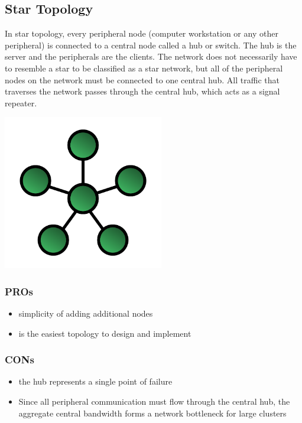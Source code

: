 \documentclass[a4paper,12pt]{book}
\begin{document}
\subsection{Star Topology}

In star topology, every peripheral node (computer workstation or any other peripheral) is connected to a central node called a hub or switch. The hub is the server and the peripherals are the clients. The network does not necessarily have to resemble a star to be classified as a star network, but all of the peripheral nodes on the network must be connected to one central hub. All traffic that traverses the network passes through the central hub, which acts as a signal repeater.

\noindent \includegraphics[width=7cm]{./StarNetwork.svg.PNG} \newline

\subsubsection{PROs}

\begin{itemize}
\item {simplicity of adding additional nodes}
\item {is the easiest topology to design and implement}
\end{itemize}

\subsubsection{CONs}

\begin{itemize}
\item {the hub represents a single point of failure}
\item {Since all peripheral communication must flow through the central hub, the aggregate central bandwidth forms a network bottleneck for large clusters}
\end{itemize}
\end{document}
